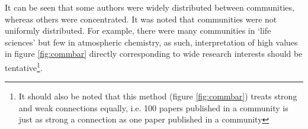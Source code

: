 It can be seen that some authors were widely distributed between communities, whereas others were concentrated.
It was noted that communities were not uniformly distributed. For example, there were many communities in `life sciences' but few in atmospheric chemistry, as such, interpretation of high values in figure \ref{fig:commbar} directly corresponding to wide research interests should be tentative\footnote{It should also be noted that this method (figure \ref{fig:commbar}) treats strong and weak connections equally, i.e. 100 papers published in a community is just as strong a connection as one paper published in a community}.


